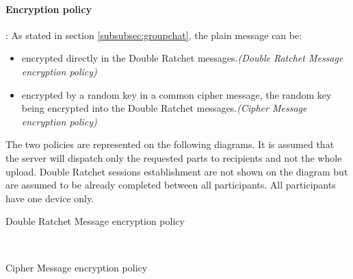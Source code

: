 \documentclass[a4paper,11pt]{article}
\begin{document}
      \paragraph*{Encryption policy}: As stated in section \ref{subsubsec:groupchat}, the plain message can be:
      \label{encryptionPolicyMSC}
      \begin{itemize}
        \item encrypted directly in the Double Ratchet messages.\textit{(Double Ratchet Message encryption policy)}
        \item encrypted by a random key in a common cipher message, the random key being encrypted into the Double Ratchet messages.\textit{(Cipher Message encryption policy)}
      \end{itemize}
      The two policies are represented on the following diagrams. It is assumed that the server will dispatch only the requested parts to recipients and not the whole upload. Double Ratchet sessions establishment are not shown on the diagram but are assumed to be already completed between all participants. All participants have one device only.\\\newline
      \begin{msc}{Double Ratchet Message encryption policy}
        \setlength{\instdist}{3.8cm}
        \setlength{\instwidth}{1.9cm}
        \setlength{\actionwidth}{1.7cm}
        \setlength{\envinstdist}{1.7cm}
        \nextlevel[3]
        \nextlevel[2]
        \nextlevel
      \end{msc}
      \\\newline
      \begin{msc}{Cipher Message encryption policy}
        \setlength{\instdist}{3.8cm}
        \setlength{\instwidth}{1.9cm}
        \setlength{\actionwidth}{1.7cm}
        \setlength{\envinstdist}{1.9cm}
        \nextlevel[3]
        \nextlevel[2]
        \nextlevel
      \end{msc}
      
\end{document}
